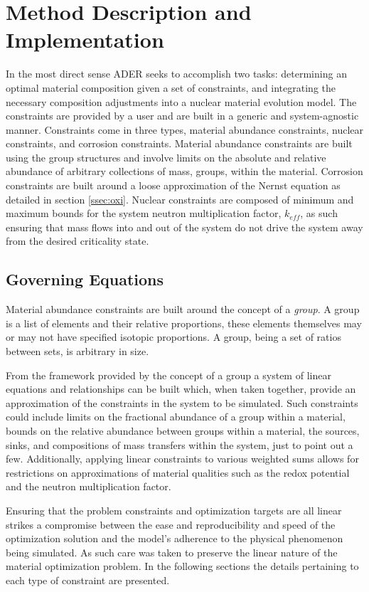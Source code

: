 \chapter{Method Description and Implementation}
\label{ch:method}

In the most direct sense ADER seeks to accomplish two tasks: 
determining an optimal material composition given a set of constraints, 
and integrating the necessary composition adjustments into a nuclear 
material evolution model. The
constraints are provided by a user and are built in a generic and
system-agnostic manner. Constraints come in three types, material abundance
constraints, nuclear constraints, and corrosion constraints. Material abundance
constraints are built using the group structures and involve limits on the
absolute and relative abundance of arbitrary collections of mass, groups, within
the material. Corrosion constraints are built around a loose approximation
of the Nernst equation as detailed in section \ref{ssec:oxi}. Nuclear
constraints are composed of minimum and maximum bounds for the system
neutron multiplication factor, $k_{eff}$, as such ensuring that mass flows
into and out of the system do not drive the system away from the desired
criticality state.

\section{Governing Equations}\label{sec:equations}
Material abundance constraints are built around the concept of a \textit{group}.
A group is a list of elements and their relative proportions,
these elements themselves may or may not have specified isotopic proportions. 
A group, being a set of ratios between sets, is arbitrary in size.

From the framework provided by the concept of a group a system of 
linear equations and relationships can be built which, when taken together, 
provide an approximation of the constraints in the system to be simulated. Such
constraints could include limits on the fractional abundance of a group within
a material, bounds on the  relative abundance between groups within a material, 
the sources, sinks, and compositions of mass transfers within
the system, just to point out a few. 
Additionally, applying linear constraints to various weighted sums allows for
restrictions on approximations of material qualities such as the redox 
potential and the neutron multiplication factor. 

Ensuring that the problem constraints and optimization targets are all linear 
strikes a compromise between the ease and reproducibility and speed of the 
optimization  solution and the model's adherence to the physical phenomenon
being simulated. 
As such care was taken to preserve the linear nature of the material 
optimization problem. In the following sections the details pertaining to each
type of constraint are presented.

